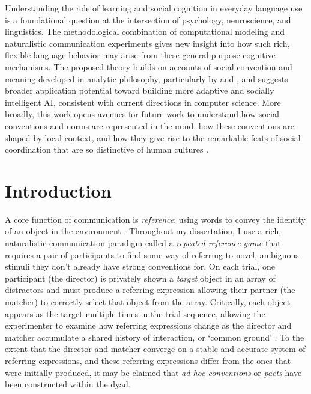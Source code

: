 \documentclass[11pt]{article}
\begin{document}
Understanding the role of learning and social cognition in everyday language use is a foundational question at the intersection of psychology, neuroscience, and linguistics. 
The methodological combination of computational modeling and naturalistic communication experiments gives new insight into how such rich, flexible language behavior may arise from these general-purpose cognitive mechanisms.
The proposed theory builds on accounts of social convention and meaning developed in analytic philosophy, particularly by  and , and suggests broader application potential toward building more adaptive and socially intelligent AI, consistent with current directions in computer science. 
More broadly, this work opens avenues for future work to understand how social conventions and norms are represented in the mind, how these conventions are shaped by local context, and how they give rise to the remarkable feats of social coordination that are so distinctive of human cultures \cite{hawkins2019emergence}.

\section*{Introduction}

A core function of communication is \emph{reference}: using words to convey the identity of an object in the environment \cite{Brown58_HowShallAThingBeCalled,Searle69_SpeechActs,van_deemter_computational_2016}.
Throughout my dissertation, I use a rich, naturalistic communication paradigm called a \emph{repeated reference game} \cite{KraussWeinheimer64_ReferencePhrases} that requires a pair of participants to find some way of referring to novel, ambiguous stimuli they don't already have strong conventions for.
On each trial, one participant (the director) is privately shown a \emph{target} object in an array of distractors and must produce a referring expression allowing their partner (the matcher) to correctly select that object from the array. 
Critically, each object appears as the target multiple times in the trial sequence, allowing the experimenter to examine how referring expressions change as the director and matcher accumulate a shared history of interaction, or `common ground' \cite{clark_using_1996}.
To the extent that the director and matcher converge on a stable and accurate system of referring expressions, and these referring expressions differ from the ones that were initially produced, it may be claimed that \emph{ad hoc conventions} or \emph{pacts} have been constructed within the dyad.
\end{document}

